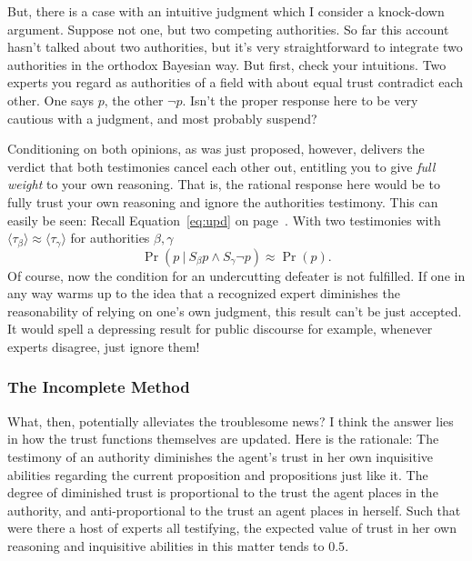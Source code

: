 \documentclass[11pt, a4paper]{scrartcl}
\newcommand{\given}[1][]{\:#1\vert\:}
\renewcommand{\i}[1]{\emph{#1}}
\begin{document}
But, there is a case with an intuitive judgment which I consider a knock-down argument. Suppose not one, but two competing authorities. So far this account hasn't talked about two authorities, but it's very straightforward to integrate two authorities in the orthodox Bayesian way. But first, check your intuitions. Two experts you regard as authorities of a field with about equal trust contradict each other. One says $p$, the other $\neg p$. Isn't the proper response here to be very cautious with a judgment, and most probably suspend? 

Conditioning on both opinions, as was just proposed, however, delivers the verdict that both testimonies cancel each other out, entitling you to give \i{full weight} to your own reasoning. That is, the rational response here would be to fully trust your own reasoning and ignore the authorities testimony. This can easily be seen: Recall Equation~\ref{eq:upd} on page~\pageref{eq:upd}. With two testimonies with $\langle \tau_\beta \rangle \approx \langle \tau_\gamma \rangle$ for authorities $\beta, \gamma$
\[ \Pr(p \given S_\beta p \land S_\gamma \neg p) \approx \Pr(p). \] Of course, now the condition for an undercutting defeater is not fulfilled. If one in any way warms up to the idea that a recognized expert diminishes the reasonability of relying on one's own judgment, this result can't be just accepted. It would spell a depressing result for public discourse for example, whenever experts disagree, just ignore them!  

\subsubsection{The Incomplete Method}

What, then, potentially alleviates the troublesome news? I think the answer lies in how the trust functions themselves are updated. Here is the rationale: The testimony of an authority diminishes the agent's trust in her own inquisitive abilities regarding the current proposition and propositions just like it. The degree of diminished trust is proportional to the trust the agent places in the authority, and anti-proportional to the trust an agent places in herself. Such that were there a host of experts all testifying, the expected value of trust in her own reasoning and inquisitive abilities in this matter tends to $0.5$. 
\end{document}
